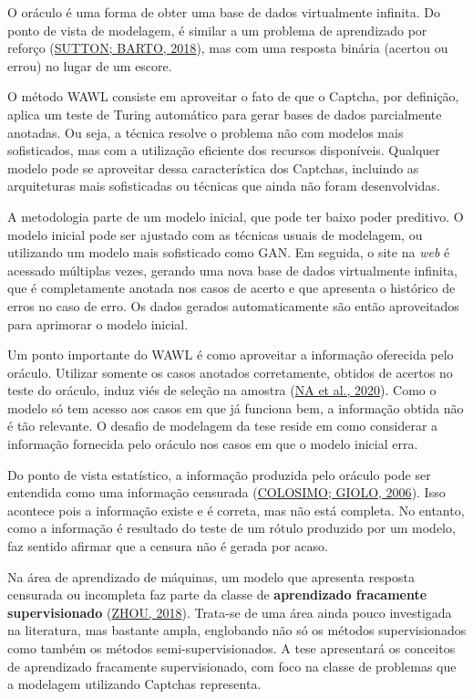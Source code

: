 \documentclass[12pt,twoside,brazilian]{book}
\begin{document}
O oráculo é uma forma de obter uma base de dados virtualmente infinita.
Do ponto de vista de modelagem, é similar a um problema de aprendizado
por reforço (\protect\hyperlink{ref-sutton2018}{SUTTON; BARTO, 2018}),
mas com uma resposta binária (acertou ou errou) no lugar de um escore.

O método WAWL consiste em aproveitar o fato de que o Captcha, por
definição, aplica um teste de Turing automático para gerar bases de
dados parcialmente anotadas. Ou seja, a técnica resolve o problema não
com modelos mais sofisticados, mas com a utilização eficiente dos
recursos disponíveis. Qualquer modelo pode se aproveitar dessa
característica dos Captchas, incluindo as arquiteturas mais sofisticadas
ou técnicas que ainda não foram desenvolvidas.

A metodologia parte de um modelo inicial, que pode ter baixo poder
preditivo. O modelo inicial pode ser ajustado com as técnicas usuais de
modelagem, ou utilizando um modelo mais sofisticado como GAN. Em
seguida, o site na \emph{web} é acessado múltiplas vezes, gerando uma
nova base de dados virtualmente infinita, que é completamente anotada
nos casos de acerto e que apresenta o histórico de erros no caso de
erro. Os dados gerados automaticamente são então aproveitados para
aprimorar o modelo inicial.

Um ponto importante do WAWL é como aproveitar a informação oferecida
pelo oráculo. Utilizar somente os casos anotados corretamente, obtidos
de acertos no teste do oráculo, induz viés de seleção na amostra
(\protect\hyperlink{ref-na2020}{NA et al., 2020}). Como o modelo só tem
acesso aos casos em que já funciona bem, a informação obtida não é tão
relevante. O desafio de modelagem da tese reside em como considerar a
informação fornecida pelo oráculo nos casos em que o modelo inicial
erra.

Do ponto de vista estatístico, a informação produzida pelo oráculo pode
ser entendida como uma informação censurada
(\protect\hyperlink{ref-colosimo2006}{COLOSIMO; GIOLO, 2006}). Isso
acontece pois a informação existe e é correta, mas não está completa. No
entanto, como a informação é resultado do teste de um rótulo produzido
por um modelo, faz sentido afirmar que a censura não é gerada por acaso.

Na área de aprendizado de máquinas, um modelo que apresenta resposta
censurada ou incompleta faz parte da classe de \textbf{aprendizado
fracamente supervisionado} (\protect\hyperlink{ref-zhou2018}{ZHOU,
2018}). Trata-se de uma área ainda pouco investigada na literatura, mas
bastante ampla, englobando não só os métodos supervisionados como também
os métodos semi-supervisionados. A tese apresentará os conceitos de
aprendizado fracamente supervisionado, com foco na classe de problemas
que a modelagem utilizando Captchas representa.
\end{document}
